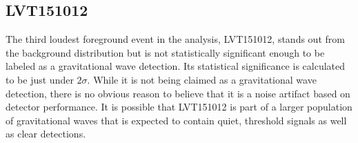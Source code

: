 \subsection{LVT151012}

The third loudest foreground event in the analysis, LVT151012, stands out 
from the background distribution but is not statistically significant 
enough to be labeled as a gravitational wave detection. Its statistical 
significance is calculated to be just under $2\sigma$. While it is not 
being claimed as a gravitational wave detection, there is no obvious 
reason to believe that it is a noise artifact based on detector 
performance. It is possible that LVT151012 is part of a larger 
population of gravitational waves that is expected to contain 
quiet, threshold signals as well as clear detections.

